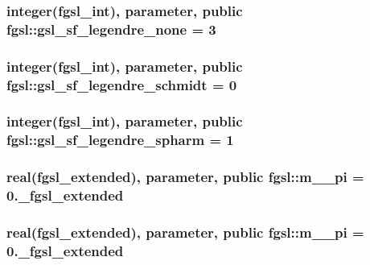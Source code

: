 \subsubsection[{gsl\+\_\+sf\+\_\+legendre\+\_\+none}]{\setlength{\rightskip}{0pt plus 5cm}integer({\bf fgsl\+\_\+int}), parameter, public fgsl\+::gsl\+\_\+sf\+\_\+legendre\+\_\+none = 3}\label{namespacefgsl_a09eadb78c5f3fc4662d23ac52aaa33b3}
\hypertarget{namespacefgsl_a2621c92cbb7a2c08eaaaa7f9cd3a32ff}{}
\subsubsection[{gsl\+\_\+sf\+\_\+legendre\+\_\+schmidt}]{\setlength{\rightskip}{0pt plus 5cm}integer({\bf fgsl\+\_\+int}), parameter, public fgsl\+::gsl\+\_\+sf\+\_\+legendre\+\_\+schmidt = 0}\label{namespacefgsl_a2621c92cbb7a2c08eaaaa7f9cd3a32ff}
\hypertarget{namespacefgsl_a16ccc1e4e6aa459e435bad49a3c88e62}{}
\subsubsection[{gsl\+\_\+sf\+\_\+legendre\+\_\+spharm}]{\setlength{\rightskip}{0pt plus 5cm}integer({\bf fgsl\+\_\+int}), parameter, public fgsl\+::gsl\+\_\+sf\+\_\+legendre\+\_\+spharm = 1}\label{namespacefgsl_a16ccc1e4e6aa459e435bad49a3c88e62}
\hypertarget{namespacefgsl_a10fdf50a29d35a63b13bc641ed465051}{}
\subsubsection[{m\+\_\+1\+\_\+pi}]{\setlength{\rightskip}{0pt plus 5cm}real({\bf fgsl\+\_\+extended}), parameter, public fgsl\+::m\+\_\+\_\+pi = 0.\+\_\+fgsl\+\_\+extended}\label{namespacefgsl_a10fdf50a29d35a63b13bc641ed465051}
\hypertarget{namespacefgsl_a28e530e58a51ac2bbce00674f617bbbd}{}
\subsubsection[{m\+\_\+2\+\_\+pi}]{\setlength{\rightskip}{0pt plus 5cm}real({\bf fgsl\+\_\+extended}), parameter, public fgsl\+::m\+\_\+\_\+pi = 0.\+\_\+fgsl\+\_\+extended}\label{namespacefgsl_a28e530e58a51ac2bbce00674f617bbbd}
\hypertarget{namespacefgsl_a20272585dc8f0b54e493f4717330469a}{}
